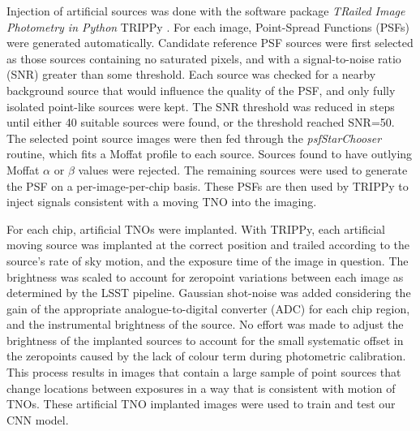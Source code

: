 \documentclass{aastex631}
\begin{document}
Injection of artificial sources was done with the software package \emph{TRailed Image Photometry in Python} TRIPPy \citep{2016AJ....151..158F}. 
For each image, Point-Spread Functions (PSFs) were generated automatically. 
Candidate reference PSF sources were first selected as those sources containing no saturated pixels, and with a signal-to-noise  ratio (SNR) greater than some threshold. 
Each source was checked for a nearby background source that would influence the quality of the PSF, and only fully isolated point-like sources were kept. 
The SNR threshold was reduced in steps until either 40 suitable sources were found, or the threshold reached SNR=50. 
The selected point source images were then fed through the \emph{psfStarChooser} routine, which fits a Moffat profile to each source. 
Sources found to have outlying Moffat $\alpha$ or $\beta$ values were rejected. 
The remaining sources were used to generate the PSF on a per-image-per-chip basis. These PSFs are then used by TRIPPy to inject signals consistent with a moving TNO into the imaging.

For each chip, artificial TNOs were implanted. 
With TRIPPy, each artificial moving source was implanted at the correct position and trailed according to the source's rate of sky motion, and the exposure time of the image in question. 
The brightness was scaled to account for zeropoint variations between each image as determined by the LSST pipeline. 
Gaussian shot-noise was added considering the gain of the appropriate analogue-to-digital converter (ADC) for each chip region, and the instrumental brightness of the source. 
No effort was made to adjust the brightness of the implanted sources to account for the small systematic offset in the zeropoints caused by the lack of colour term during photometric calibration. 
This process results in images that contain a large sample of point sources that change locations between exposures in a way that is consistent with motion of TNOs.
These artificial TNO implanted images were used to train and test our CNN model.
\end{document}
